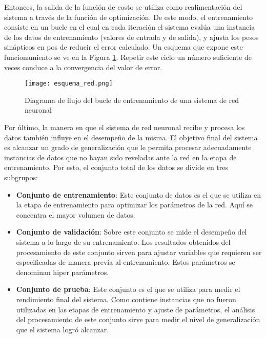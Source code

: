 Entonces, la salida de la función de costo se utiliza como realimentación del sistema a través de la función de optimización. De este modo, el entrenamiento consiste en un bucle en el cual en cada iteración el sistema evalúa una instancia de los datos de entrenamiento (valores de entrada y de salida), y ajusta los pesos sinápticos en pos de reducir el error calculado. Un esquema que expone este funcionamiento se ve en la Figura \ref{fig:esquema}. Repetir este ciclo un número suficiente de veces conduce a la convergencia del valor de error. 

\begin{figure}[H]
  \centering{}
  \texttt{[image: esquema\_red.png]}
  \caption{Diagrama de flujo del bucle de entrenamiento de una sistema de red neuronal}
  \label{fig:esquema}
\end{figure}

Por último, la manera en que el sistema de red neuronal recibe y procesa los datos también influye en el desempeño de la misma. El objetivo final del sistema es alcanzar un grado de generalización que le permita procesar adecuadamente instancias de datos que no hayan sido reveladas ante la red en la etapa de entrenamiento. Por esto, el conjunto total de los datos se divide en tres subgrupos: 

\begin{itemize}
\item\textbf{Conjunto de entrenamiento}: Este conjunto de datos es el que se utiliza en la etapa de entrenamiento para optimizar los parámetros de la red. Aquí se concentra el mayor volumen de datos.

\item\textbf{Conjunto de validación}: Sobre este conjunto se mide el desempeño del sistema a lo largo de su entrenamiento. Los resultados obtenidos del procesamiento de este conjunto sirven para ajustar variables que requieren ser especificadas de manera previa al entrenamiento. Estos parámetros se denominan hiper parámetros.
 
\item\textbf{Conjunto de prueba}: Este conjunto es el que se utiliza para medir el rendimiento final del sistema. Como contiene instancias que no fueron utilizadas en las etapas de entrenamiento y ajuste de parámetros, el análisis del procesamiento de este conjunto sirve para medir el nivel de generalización que el sistema logró alcanzar. 

\end{itemize}


